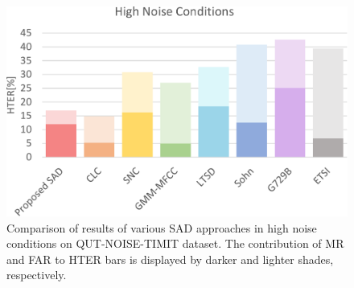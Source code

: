 \documentclass[FM,noheader,EN,bwtitles]{tulthesis}
\begin{document}
\begin{figure}
\centering
\includegraphics[scale=0.5]{img/gHigh.pdf}
\caption{Comparison of results of various SAD approaches in high noise conditions on QUT-NOISE-TIMIT dataset. The contribution of MR and FAR to HTER bars is displayed by darker and lighter shades, respectively.}
\label{fig:high}
\end{figure}





\end{document}
